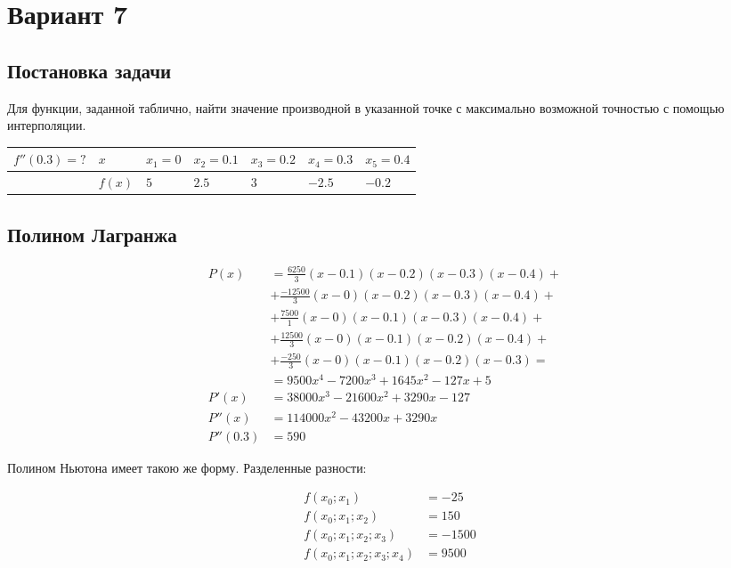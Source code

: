 \documentclass[../main.tex]{subfiles}
\begin{document}
\section{Вариант 7}

\subsection{Постановка задачи}

Для функции, заданной таблично, найти значение производной в указанной точке с максимально возможной точностью с помощью интерполяции.


\begin{table}[h]
    \centering
    \begin{tabular}{|l|l|l|l|l|l|l|}
    \hline
    $f''(0.3)=?$ & $x$ & $x_1 = 0$ & $x_2 = 0.1$ & $x_3 = 0.2$  & $x_4 = 0.3$ & $x_5 = 0.4$  \\ \hline
    & $f(x)$ & $5$ & $2.5$ & $3$ & $-2.5$ & $-0.2$ \\ \hline
    \end{tabular}
\end{table}

\subsection{Полином Лагранжа}

\begin{align*}
    P(x) & = \frac{6250}{3}(x-0.1)(x-0.2)(x-0.3)(x-0.4) + & \\
      & + \frac{-12500}{3}(x-0)(x-0.2)(x-0.3)(x-0.4) + & \\
      & + \frac{7500}{1}(x-0)(x-0.1)(x-0.3)(x-0.4) + & \\
      & + \frac{12500}{3}(x-0)(x-0.1)(x-0.2)(x-0.4) + & \\
      & + \frac{-250}{3}(x-0)(x-0.1)(x-0.2)(x-0.3) = & \\
      & = 9500 x^4 - 7200 x^3 + 1645 x^2 - 127 x + 5 & \\
    P'(x) & = 38000 x^3 - 21600 x^2 + 3290 x - 127 & \\
    P''(x) & = 114000 x^2 - 43200 x + 3290 x & \\
    P''(0.3) & = 590 &
\end{align*}

Полином Ньютона имеет такою же форму. Разделенные разности:

\begin{align*}
    f(x_0; x_1) & = -25 \\
    f(x_0; x_1; x_2) & = 150 \\
    f(x_0; x_1; x_2; x_3) & = -1500 \\
    f(x_0; x_1; x_2; x_3; x_4) & = 9500
\end{align*}
\end{document}
